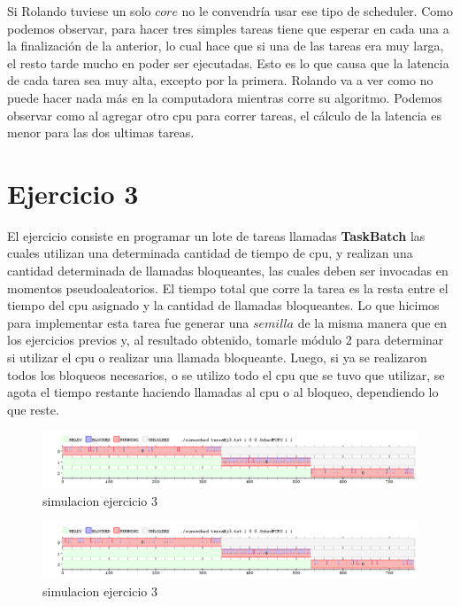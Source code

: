 \documentclass[11pt]{article}
\begin{document}
\begin{enumerate}
Si Rolando tuviese un solo $core$ no le convendría usar ese tipo de scheduler. Como podemos observar, para hacer tres simples tareas
tiene que esperar en cada una a la finalización de la anterior, lo cual hace que si una de las tareas era muy larga, el resto tarde mucho en 
poder ser ejecutadas. Esto es lo que causa que la latencia de cada tarea sea muy alta, excepto por la primera.
Rolando va a ver como no puede hacer nada más en la computadora mientras corre su algoritmo.
Podemos observar como al agregar otro cpu para correr tareas, el cálculo de la latencia es menor para las dos ultimas tareas. 

  \newpage

  \section{Ejercicio 3}

  El ejercicio consiste en programar un lote de tareas llamadas \textbf{TaskBatch} las cuales utilizan una determinada cantidad de tiempo de cpu, y 
  realizan una cantidad determinada de llamadas bloqueantes, las cuales deben ser invocadas en momentos pseudoaleatorios. El tiempo total que corre 
  la tarea es la resta entre el tiempo del cpu asignado y la cantidad de llamadas bloqueantes. Lo que hicimos para implementar esta tarea fue generar 
  una $semilla$ de la misma manera que en los ejercicios previos y, al resultado obtenido, tomarle módulo 2 para determinar si utilizar el cpu o 
  realizar una llamada bloqueante. Luego, si ya se realizaron todos los bloqueos necesarios, o se utilizo todo el cpu que se tuvo que utilizar, se 
  agota el tiempo restante haciendo llamadas al cpu o al bloqueo, dependiendo lo que reste.

    \begin{figure}[H]
      \includegraphics[scale=0.5]{Ejercicio3_1}
      \caption{simulacion ejercicio 3}
    \end{figure}

    \begin{figure}[H]
      \includegraphics[scale=0.5]{Ejercicio3_2}
      \caption{simulacion ejercicio 3}
    \end{figure}


\end{enumerate}
\end{document}
